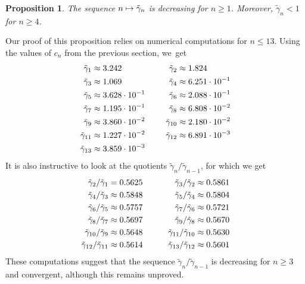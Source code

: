 \documentclass[10pt]{amsart}
\newcommand\mto{\mathchoice{\longmapsto}{\mapsto}{\mapsto}{\mapsto}}
\newtheorem{proposition}[theorem]{Proposition}
\theoremstyle{definition}
\newcommand{\1}{\mathbbm{1}}
\begin{document}
\begin{proposition}\label{gammatildemono}
The sequence $n\mto \tilde\gamma_n$ is decreasing for $n\geq 1$. Moreover, $\tilde\gamma_n<1$ for $n\geq 4$.
\end{proposition}

Our proof of this proposition relies on numerical computations for $n\leq 13$. Using the values of $c_n$ from the previous section, we~get
\[
\begin{aligned}
\tilde\gamma_1 & \approx 3.242&
\tilde\gamma_2 & \approx 1.824\\
\tilde\gamma_3 & \approx 1.069&
\tilde\gamma_4 &\approx 6.251 \cdot 10^{-1} \\
\tilde\gamma_5 &\approx 3.628 \cdot 10^{-1} &
\tilde\gamma_6 & \approx  2.088 \cdot 10^{-1} \\
\tilde\gamma_7 & \approx 1.195\cdot 10^{-1} &
\tilde\gamma_8 & \approx  6.808\cdot 10^{-2} \\
\tilde\gamma_9 & \approx  3.860\cdot10^{-2} &
\tilde\gamma_{10} & \approx 2.180 \cdot 10^{-2} \\
\tilde\gamma_{11} &\approx 1.227\cdot 10^{-2} &
\tilde\gamma_{12} &\approx 6.891\cdot 10^{-3}  \\
\tilde\gamma_{13} & \approx 3.859\cdot 10^{-3}&\hspace*{1cm}
\end{aligned}
\]
It is also instructive to look at the quotients $\tilde\gamma_n/\tilde\gamma_{n-1}$, for which we get
\[
\begin{aligned}
\tilde\gamma_2/\tilde\gamma_1 & =  0.5625 &\hspace*{1cm}
\tilde\gamma_3/\tilde\gamma_2 & \approx 0.5861 \\
\tilde\gamma_4/\tilde\gamma_3 & \approx 0.5848 & \tilde\gamma_5/\tilde\gamma_4 & \approx 0.5804 \\
\tilde\gamma_6/\tilde\gamma_5 & \approx 0.5757 &
\tilde\gamma_7/\tilde\gamma_6& \approx 0.5721 \\
\tilde\gamma_8/\tilde\gamma_7& \approx0.5697&
\tilde\gamma_9/\tilde\gamma_8& \approx0.5670\\
\tilde\gamma_{10}/\tilde\gamma_9& \approx 0.5648&
\tilde\gamma_{11}/\tilde\gamma_{10}& \approx0.5630\\
\tilde\gamma_{12}/\tilde\gamma_{11}& \approx0.5614&
\tilde\gamma_{13}/\tilde\gamma_{12}& \approx0.5601
\end{aligned}
\]
These computations suggest that the sequence $\tilde\gamma_n/\tilde\gamma_{n-1}$ is decreasing for $n\geq 3$ and convergent, although this remains unproved.
\end{document}
